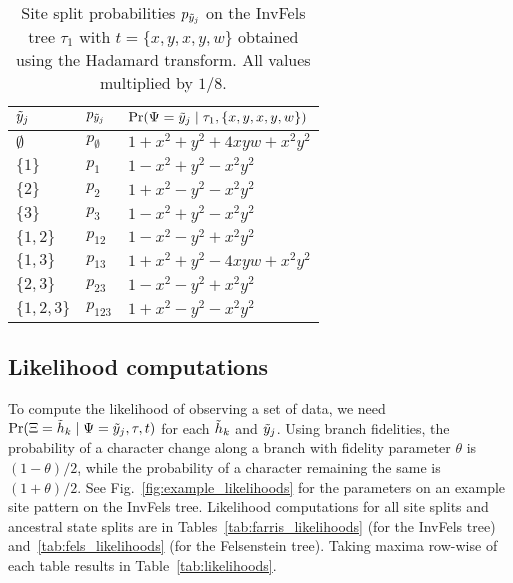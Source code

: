 \begin{table}[ht]
\centering
\begin{tabular}{|l|l|l|}
    \hline
$\tilde{y}_j$  & $p_{\tilde{y}_j}$ &$\Pr(\Psi=\tilde{y}_j \mid \tau_1,\{x,y,x,y,w\})$\\
    \hline
    $\emptyset$ & $p_{\emptyset}$   &$1+x^2+y^2+4xyw+x^2y^2$\\
    $\{1\}$     & $p_{1}$   &$1-x^2+y^2-x^2y^2$\\
    $\{2\}$     & $p_{2}$   &$1+x^2-y^2-x^2y^2$\\
    $\{3\}$     & $p_{3}$   &$1-x^2+y^2-x^2y^2$\\
    $\{1,2\}$   & $p_{12}$   &$1-x^2-y^2+x^2y^2$\\
    $\{1,3\}$   & $p_{13}$   &$1+x^2+y^2-4xyw+x^2y^2$\\
    $\{2,3\}$   & $p_{23}$   &$1-x^2-y^2+x^2y^2$\\
    $\{1,2,3\}$ & $p_{123}$   &$1+x^2-y^2-x^2y^2$\\
    \hline
\end{tabular}
\caption{Site split probabilities $p_{\tilde{y}_j}$ on the InvFels tree $\tau_1$ with $t=\{x,y,x,y,w\}$ obtained using the Hadamard transform.
All values multiplied by $1/8$.}
\label{tab:sitepatprob}
\end{table}

\subsection*{Likelihood computations}

To compute the likelihood of observing a set of data, we need $\Pr(\Xi=\tilde{h}_k \mid \Psi=\tilde{y}_j, \tau, t)$ for each $\tilde{h}_k$ and $\tilde{y}_j$.
Using branch fidelities, the probability of a character change along a branch with fidelity parameter $\theta$ is $(1-\theta)/2$, while the probability of a character remaining the same is $(1+\theta)/2$.
See Fig.~\ref{fig:example_likelihoods} for the parameters on an example site pattern on the InvFels tree.
Likelihood computations for all site splits and ancestral state splits are in Tables~\ref{tab:farris_likelihoods} (for the InvFels tree) and~\ref{tab:fels_likelihoods} (for the Felsenstein tree).
Taking maxima row-wise of each table results in Table~\ref{tab:likelihoods}.

